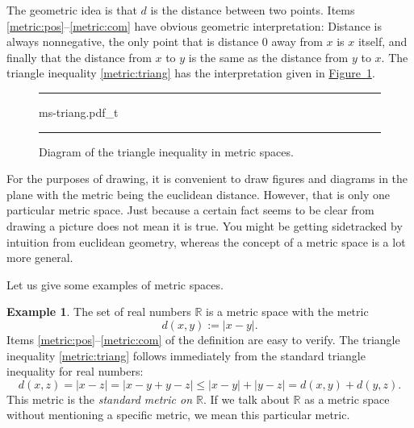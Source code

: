 \documentclass[12pt]{book}
\newenvironment{myfigureht}{%
\begin{figure}[h!t]
\noindent\rule{\textwidth}{0.4pt}\vspace{12pt}\par\centering}%
{\par\noindent\rule{\textwidth}{0.4pt}
\end{figure}}
\newcommand{\abs}[1]{\left\lvert {#1} \right\rvert}
\newcommand{\R}{{\mathbb{R}}}
\newcommand{\myindex}[1]{#1\index{#1}}
\theoremstyle{plain}
\theoremstyle{remark}
\theoremstyle{definition}
\theoremstyle{exercise}
\theoremstyle{example}
\newtheorem{example}[thm]{Example}
\newcommand{\figureref}[1]{\hyperref[#1]{Figure~\ref*{#1}}}
\begin{document}
The geometric idea is that $d$ is the distance between two points. 
Items \ref{metric:pos}--\ref{metric:com} have obvious geometric
interpretation: Distance is always nonnegative, the only point that is
distance 0 away from $x$ is $x$ itself, and finally that the distance from
$x$ to $y$ is the same as the distance from $y$ to $x$.  The triangle
inequality \ref{metric:triang} has the interpretation given in
\figureref{fig:mstriang}.
\begin{myfigureht}
{ms-triang.pdf_t}
\caption{Diagram of the triangle inequality in metric spaces.\label{fig:mstriang}}
\end{myfigureht}

For the purposes of drawing, it is convenient to draw figures and
diagrams in the plane with the metric being the euclidean distance.
However, that is only one particular metric space.  Just because a
certain fact seems to be clear from drawing a picture does not mean it is
true.  You might be getting sidetracked by intuition from euclidean
geometry,
whereas the concept of a metric space is a lot more general.

Let us give some examples of metric spaces.

\begin{example}
The set of real numbers $\R$ is a metric space with the metric
\begin{equation*}
d(x,y) := \abs{x-y} .
\end{equation*}
Items \ref{metric:pos}--\ref{metric:com} of the definition
are easy to verify.  The
triangle inequality \ref{metric:triang} follows immediately
from the standard triangle inequality for real numbers:
\begin{equation*}
d(x,z) = \abs{x-z} = 
\abs{x-y+y-z} \leq
\abs{x-y}+\abs{y-z} =
d(x,y)+ d(y,z) .
\end{equation*}
This metric is the \emph{\myindex{standard metric on $\R$}}.  If we talk
about $\R$ as a metric space without mentioning a specific metric, we 
mean this particular metric.
\end{example}
\end{document}
